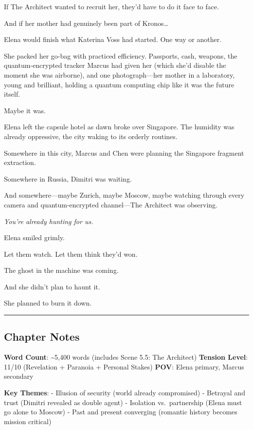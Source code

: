 If The Architect wanted to recruit her, they'd have to do it face to face.

And if her mother had genuinely been part of Kronos\ldots{}

Elena would finish what Katerina Voss had started. One way or another.

She packed her go-bag with practiced efficiency. Passports, cash, weapons, the quantum-encrypted tracker Marcus had given her (which she'd disable the moment she was airborne), and one photograph---her mother in a laboratory, young and brilliant, holding a quantum computing chip like it was the future itself.

Maybe it was.

Elena left the capsule hotel as dawn broke over Singapore. The humidity was already oppressive, the city waking to its orderly routines.

Somewhere in this city, Marcus and Chen were planning the Singapore fragment extraction.

Somewhere in Russia, Dimitri was waiting.

And somewhere---maybe Zurich, maybe Moscow, maybe watching through every camera and quantum-encrypted channel---The Architect was observing.

\emph{You're already hunting for us.}

Elena smiled grimly.

Let them watch. Let them think they'd won.

The ghost in the machine was coming.

And she didn't plan to haunt it.

She planned to burn it down.

\begin{center}\rule{0.5\linewidth}{0.5pt}\end{center}

\hypertarget{chapter-notes}{%
\subsection{Chapter Notes}\label{chapter-notes}}

\textbf{Word Count}: \textasciitilde5,400 words (includes Scene 5.5: The Architect) \textbf{Tension Level}: 11/10 (Revelation + Paranoia + Personal Stakes) \textbf{POV}: Elena primary, Marcus secondary

\textbf{Key Themes}: - Illusion of security (world already compromised) - Betrayal and trust (Dimitri revealed as double agent) - Isolation vs.~partnership (Elena must go alone to Moscow) - Past and present converging (romantic history becomes mission critical)


